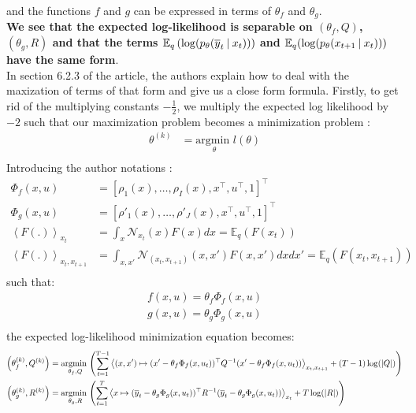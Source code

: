 and the functions $f$ and $g$ can be expressed in terms of $\theta_f$ and $\theta_g$.\\

\textbf{We see that the expected log-likelihood is separable on $(\theta_f,Q)$, $(\theta_g,R)$ and that the terms $\mathbb{E}_q\left( \log(p_{\theta}(\overline{y}_t \mathbin{\vert} x_t)) \right)$ and $\mathbb{E}_q(\log(p_{\theta}(x_{t+1} \mathbin{\vert} x_t)))$ have the same form}.\\

In section 6.2.3 of the article, the authors explain how to deal with the maxization of terms of that form and give us a close form formula.
Firstly, to get rid of the multiplying constants $-\frac{1}{2}$, we multiply the expected log likelihood by $-2$ such that our maximization problem becomes a minimization problem :
\begin{align*}
  \theta^{(k)} &= \underset{\theta}{\text{argmin }}l(\theta)\\
\end{align*}
Introducing the author notations :
\begin{align*}
  \Phi_f(x, u) &= [\rho_1(x), \ldots , \rho_I(x), x^{\top}, u^{\top}, 1]^{\top}\\
  \Phi_g(x, u) &= [\rho'_1(x), \ldots , \rho'_J(x), x^{\top}, u^{\top}, 1]^{\top}\\
  \left< F(.) \right>_{x_t} &= \int_x{\mathcal{N}_{x_t}(x) F(x) dx} = \mathbb{E}_q \left( F(x_t) \right)\\
  \left< F(.) \right>_{x_t,x_{t+1}} &= \int_{x, x'}{\mathcal{N}_{(x_t, x_{t+1})}(x, x') F(x,x') dx}dx' = \mathbb{E}_q \left( F(x_t, x_{t+1}) \right)\\
\end{align*} %
such that:
\begin{align*}
  f(x,u) = \theta_f \Phi_f(x, u)\\
  g(x,u) = \theta_g \Phi_g(x, u)\\
\end{align*}
the expected log-likelihood minimization equation becomes:
\begin{align*}
  \left( \theta_f^{(k)},Q^{(k)} \right) &=
    \underset{\theta_f,Q}{\text{argmin }}{\left(
      \sum_{t=1}^{T-1}{\left< (x, x') \mapsto (x' - \theta_f\Phi_f(x,u_t))^{\top} Q^{-1}(x' - \theta_f\Phi_f(x,u_t)) \right>_{x_t,x_{t+1}} + (T-1) \log( \mathbin{\vert} Q \mathbin{\vert} )}
    \right)}\\
  \left( \theta_g^{(k)}, R^{(k)} \right) &=
    \underset{\theta_g,R}{\text{argmin }}{\left(
      \sum_{t=1}^{T}{\left< x \mapsto (\overline{y}_{t} - \theta_g \Phi_g(x, u_t))^{\top} R^{-1} (\overline{y}_{t} - \theta_g \Phi_g(x, u_t)) \right>_{x_t} + T \log( \mathbin{\vert} R \mathbin{\vert} )
    }\right)}\\
\end{align*}

